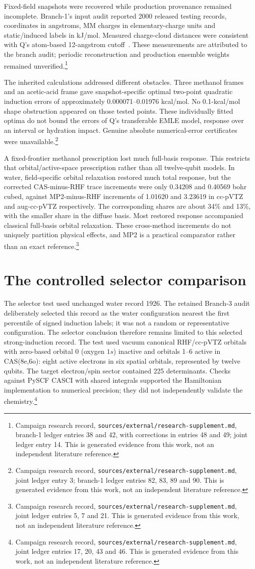 \documentclass{article}
\newcommand{\record}[1]{\footnote{Campaign research record, \texttt{sources/external/research-supplement.md}, #1. This is generated evidence from this work, not an independent literature reference.}}
\begin{document}
Fixed-field snapshots were recovered while production provenance remained incomplete. Branch-1's input audit reported 2000 released testing records, coordinates in angstroms, MM charges in elementary-charge units and static/induced labels in kJ/mol. Measured charge-cloud distances were consistent with Q's atom-based 12-angstrom cutoff~\cite{Q}. These measurements are attributed to the branch audit; periodic reconstruction and production ensemble weights remained unverified.\record{branch-1 ledger entries 38 and 42, with corrections in entries 48 and 49; joint ledger entry 14}

The inherited calculations addressed different obstacles. Three methanol frames and an acetic-acid frame gave snapshot-specific optimal two-point quadratic induction errors of approximately 0.000071--0.01976 kcal/mol. No 0.1-kcal/mol shape obstruction appeared on those tested points. These individually fitted optima do not bound the errors of Q's transferable EMLE model, response over an interval or hydration impact. Genuine absolute numerical-error certificates were unavailable.\record{joint ledger entry 3; branch-1 ledger entries 82, 83, 89 and 90}

A fixed-frontier methanol prescription lost much full-basis response. This restricts that orbital/active-space prescription rather than all twelve-qubit models. In water, field-specific orbital relaxation restored much total response, but the corrected CAS-minus-RHF trace increments were only 0.34208 and 0.40569 bohr cubed, against MP2-minus-RHF increments of 1.01620 and 3.23619 in cc-pVTZ and aug-cc-pVTZ respectively. The corresponding shares are about 34\% and 13\%, with the smaller share in the diffuse basis. Most restored response accompanied classical full-basis orbital relaxation. These cross-method increments do not uniquely partition physical effects, and MP2 is a practical comparator rather than an exact reference.\record{joint ledger entries 5, 7 and 21}

\section{The controlled selector comparison}
The selector test used unchanged water record 1926. The retained Branch-3 audit deliberately selected this record as the water configuration nearest the first percentile of signed induction labels; it was not a random or representative configuration. The selector conclusion therefore remains limited to this selected strong-induction record. The test used vacuum canonical RHF/cc-pVTZ orbitals with zero-based orbital 0 (oxygen \(1s\)) inactive and orbitals 1--6 active in CAS(8e,6o): eight active electrons in six spatial orbitals, represented by twelve qubits. The target electron/spin sector contained 225 determinants. Checks against PySCF CASCI with shared integrals supported the Hamiltonian implementation to numerical precision; they did not independently validate the chemistry.\record{joint ledger entries 17, 20, 43 and 46}
\end{document}
